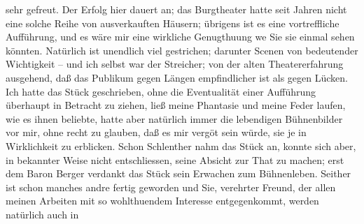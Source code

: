 \begin{ledgroupsized}[t]{13cm}
                    sehr gefreut. Der Erfolg hier dauert an; das Burgtheater hatte seit Jahren nicht eine solche Reihe von
                    ausverkauften Häusern; übrigens ist es eine vortreffliche Aufführung, und es
                    wäre mir eine wirkliche Genugthuung we{\geminationn}
               Sie sie
                    einmal sehen könnten. Natürlich ist unendlich viel gestrichen; darunter Scenen
                    von bedeutender Wichtigkeit – und ich selbst war der Streicher; von der alten
                    Theatererfahrung ausgehend, daß das Publikum gegen Längen empfindlicher ist als
                    gegen Lücken. Ich hatte das Stück geschrieben, ohne die Eventualität einer
                    Aufführung überhaupt in Betracht zu ziehen, ließ meine Phantasie und meine Feder
                    laufen, wie es ihnen beliebte, {\pb}hatte aber
                    natürlich immer die lebendigen Bühnenbilder vor mir, ohne recht zu glauben, daß
                    es mir vergö{\geminationn}t sein würde, sie je in Wirklichkeit
                    zu erblicken. Schon Schlenther nahm das Stück an, konnte sich aber,
                    in bekannter Weise nicht entschliessen, seine Absicht zur That zu machen; erst
                    dem Baron Berger verdankt  das Stück
               sein Erwachen zum Bühnenleben. Seither ist
                    schon manches andre fertig geworden und Sie, verehrter Freund, der allen meinen
                    Arbeiten mit so wohlthuendem Interesse entgegenkommt, werden natürlich auch in

\end{ledgroupsized}
